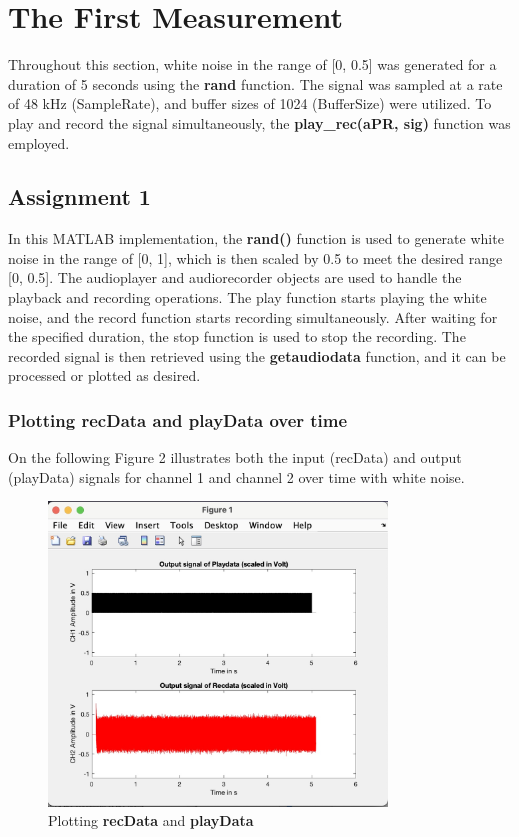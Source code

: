 \documentclass[
	a4paper,
	11pt,
]{article}
\begin{document}
\section{The First Measurement}
Throughout this section, white noise in the range of [0, 0.5] was generated for a duration of 5 seconds using the \textbf{rand} function. The signal was sampled at a rate of 48 kHz (SampleRate), and buffer sizes of 1024 (BufferSize) were utilized. To play and record the signal simultaneously, the \textbf{play\_rec(aPR, sig)} function was employed.

\subsection{Assignment 1}
In this MATLAB implementation, the \textbf{rand()} function is used to generate white noise in the range of [0, 1], which is then scaled by 0.5 to meet the desired range [0, 0.5]. The audioplayer and audiorecorder objects are used to handle the playback and recording operations. The play function starts playing the white noise, and the record function starts recording simultaneously. After waiting for the specified duration, the stop function is used to stop the recording. 
The recorded signal is then retrieved using the \textbf{getaudiodata} function, and it can be processed or plotted as desired.
\\

\subsubsection{Plotting \textbf{recData} and \textbf{playData} over time}
On the following Figure 2 illustrates both the input (recData) and output (playData) signals for channel 1 and channel 2 over time with white noise.\\
\indent
\begin{figure}[htb!]
    \centerline{\includegraphics[width=9cm]{1_img/1(a).jpg}}
     \caption[ Plotting \textbf{recData} and \textbf{playData} ]
        {\small  Plotting \textbf{recData} and \textbf{playData} } 
\end{figure}
\indent
\end{document}
